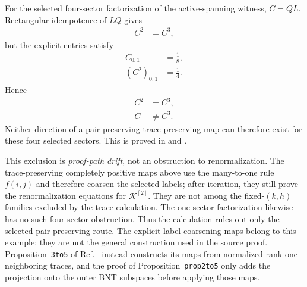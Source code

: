 \documentclass{article}
\begin{document}
For the selected four-sector factorization of the active-spanning witness,
$C=QL$. Rectangular idempotence of $LQ$ gives
\begin{align}
    C^2
        &= C^3,
    \label{eq:cpgsv17_selected_trace_square_cube}
\end{align}
but the explicit entries satisfy
\begin{align}
    C_{0,1}
        &= \frac18,
    \label{eq:cpgsv17_selected_trace_entry}\\
    (C^2)_{0,1}
        &= \frac14.
    \label{eq:cpgsv17_selected_trace_square_entry}
\end{align}
Hence
\begin{align}
    C^2
        &= C^3,
    \label{eq:cpgsv17_pair_preserving_square_cube}\\
    C
        &\neq C^3.
    \label{eq:cpgsv17_pair_preserving_cube_failure}
\end{align}
Neither direction of a pair-preserving trace-preserving map can therefore
exist for these four selected sectors. This is proved in
 and
.

This exclusion is \emph{proof-path drift}, not an obstruction to
renormalization. The trace-preserving completely positive maps above use the
many-to-one rule $f(i,j)$ and therefore coarsen the selected labels; after
iteration, they still prove the renormalization equations for
$\mathcal K^{[2]}$. They are not among the fixed-$(k,h)$ families excluded by
the trace calculation. The one-sector factorization likewise has no such
four-sector obstruction. Thus the calculation rules out only the selected
pair-preserving route. The explicit label-coarsening maps belong to this
example; they are not the general construction used in the source proof.
Proposition~\texttt{3to5} of Ref.~\cite{Cirac2016MPDO_arXiv} instead
constructs its maps from normalized rank-one neighboring traces, and the proof
of Proposition~\texttt{prop2to5} only adds the projection onto the outer BNT
subspaces before applying those maps.
\end{document}
